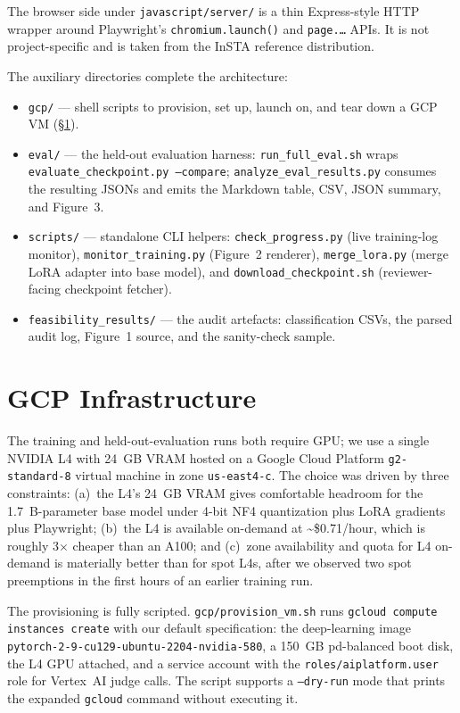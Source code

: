 \documentclass[12pt,a4paper]{report}
\begin{document}
The browser side under \texttt{javascript/server/} is a thin Express-style HTTP wrapper around Playwright's \texttt{chromium.launch()} and \texttt{page.\dots} APIs. It is not project-specific and is taken from the InSTA reference distribution.

The auxiliary directories complete the architecture:
\begin{itemize}
  \item \texttt{gcp/} --- shell scripts to provision, set up, launch on, and tear down a GCP VM (\S\ref{sec:impl-gcp}).
  \item \texttt{eval/} --- the held-out evaluation harness: \texttt{run\_full\_eval.sh} wraps \texttt{evaluate\_checkpoint.py --compare}; \texttt{analyze\_eval\_results.py} consumes the resulting JSONs and emits the Markdown table, CSV, JSON summary, and Figure~3.
  \item \texttt{scripts/} --- standalone CLI helpers: \texttt{check\_progress.py} (live training-log monitor), \texttt{monitor\_training.py} (Figure~2 renderer), \texttt{merge\_lora.py} (merge LoRA adapter into base model), and \texttt{download\_checkpoint.sh} (reviewer-facing checkpoint fetcher).
  \item \texttt{feasibility\_results/} --- the audit artefacts: classification CSVs, the parsed audit log, Figure~1 source, and the sanity-check sample.
\end{itemize}

\section{GCP Infrastructure}\label{sec:impl-gcp}

The training and held-out-evaluation runs both require GPU; we use a single NVIDIA L4 with 24~GB VRAM hosted on a Google Cloud Platform \texttt{g2-standard-8} virtual machine in zone \texttt{us-east4-c}. The choice was driven by three constraints: (a)~the L4's 24~GB VRAM gives comfortable headroom for the 1.7~B-parameter base model under 4-bit NF4 quantization plus LoRA gradients plus Playwright; (b)~the L4 is available on-demand at \textasciitilde\$0.71/hour, which is roughly 3$\times$ cheaper than an A100; and (c)~zone availability and quota for L4 on-demand is materially better than for spot L4s, after we observed two spot preemptions in the first hours of an earlier training run.

The provisioning is fully scripted. \texttt{gcp/provision\_vm.sh} runs \texttt{gcloud compute instances create} with our default specification: the deep-learning image \texttt{pytorch-2-9-cu129-ubuntu-2204-nvidia-580}, a 150~GB pd-balanced boot disk, the L4 GPU attached, and a service account with the \texttt{roles/aiplatform.user} role for Vertex~AI judge calls. The script supports a \texttt{--dry-run} mode that prints the expanded \texttt{gcloud} command without executing it.
\end{document}
